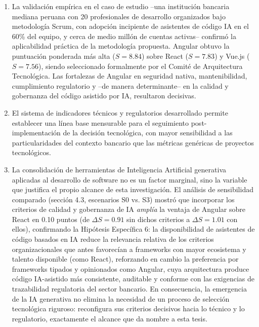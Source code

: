 \begin{enumerate}
  \item La validación empírica en el caso de estudio --una institución
        bancaria mediana peruana con 20 profesionales de desarrollo
        organizados bajo metodología Scrum, con adopción incipiente de
        asistentes de código IA en el 60\% del equipo, y cerca de medio
        millón de cuentas activas-- confirmó la aplicabilidad práctica de la
        metodología propuesta. Angular obtuvo la puntuación ponderada más
        alta ($S = 8.84$) sobre React ($S = 7.83$) y Vue.js ($S = 7.56$),
        siendo seleccionado formalmente por el Comité de Arquitectura
        Tecnológica. Las fortalezas de Angular en seguridad nativa,
        mantenibilidad, cumplimiento regulatorio y --de manera
        determinante-- en la calidad y gobernanza del código asistido por
        IA, resultaron decisivas.

  \item El sistema de indicadores técnicos y regulatorios desarrollado
        permite establecer una línea base mensurable para el seguimiento
        post-implementación de la decisión tecnológica, con mayor
        sensibilidad a las particularidades del contexto bancario que las
        métricas genéricas de proyectos tecnológicos.

  \item La consolidación de herramientas de Inteligencia Artificial
        generativa aplicadas al desarrollo de software no es un factor
        marginal, sino la variable que justifica el propio alcance de esta
        investigación. El análisis de sensibilidad comparado (sección 4.3,
        escenarios S0 vs. S3) mostró que incorporar los
        criterios de calidad y gobernanza de IA \emph{amplía} la ventaja de
        Angular sobre React en 0.10 puntos (de $\Delta S = 0.91$ sin dichos
        criterios a $\Delta S = 1.01$ con ellos), confirmando la Hipótesis
        Específica 6: la disponibilidad de asistentes de código basados en
        IA reduce la relevancia relativa de los criterios organizacionales
        que antes favorecían a frameworks con mayor ecosistema y talento
        disponible (como React), reforzando en cambio la preferencia por
        frameworks tipados y opinionados como Angular, cuya arquitectura
        produce código IA-asistido más consistente, auditable y
        conforme con las exigencias de trazabilidad regulatoria del sector
        bancario. En consecuencia, la emergencia de la IA generativa no
        elimina la necesidad de un proceso de selección tecnológica
        riguroso: reconfigura sus criterios decisivos hacia lo técnico y lo
        regulatorio, exactamente el alcance que da nombre a esta tesis.
\end{enumerate}


